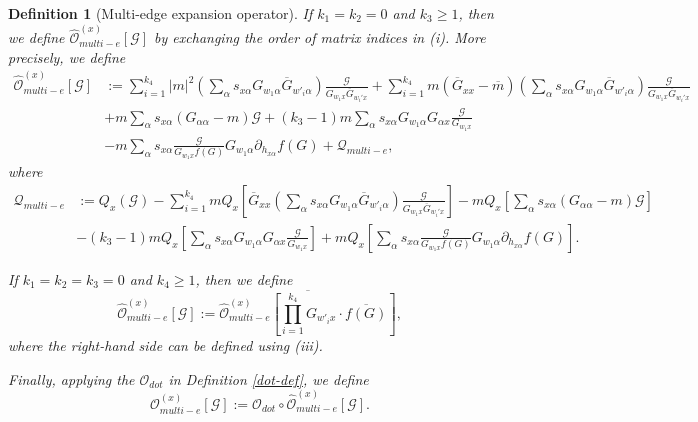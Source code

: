 \documentclass{article}
\newcommand{\1}{\mathds{1}}
\numberwithin{equation}{section}
\newcommand{\al}{\alpha}
\renewcommand{\cal}{\mathcal}
\newcommand{\wh}{\widehat}
\renewcommand{\geq}{\geqslant}
\renewcommand{\ge}{\geq}
\theoremstyle{plain} %
\newtheorem{definition}[theorem]{Definition}
\theoremstyle{remark}
\begin{document}
\begin{definition} [Multi-edge expansion operator]
 If $k_1=k_2=0$ and $k_3 \ge 1$, then we define $ \wh{\cal O}_{multi-e}^{(x)} \left[\cal G\right]$ by exchanging the order of matrix indices in (i). More precisely, we define
\begin{align} 
 \wh{\cal O}_{multi-e}^{(x)} \left[\cal G\right] & := \sum_{i=1}^{k_4}|m|^2  \left( \sum_\al s_{x\al }G_{w_1\al} \overline G_{w'_i\al}\right)\frac{\cal G}{G_{w_1x} \overline G_{w_i'x}}   + \sum_{i=1}^{k_4}m  (\overline G_{xx} -\overline m) \left( \sum_\al s_{x\al }G_{w_1 \al } \overline G_{ w'_i \al}\right)\frac{\cal G}{G_{w_1x} \overline G_{w_i' x}}    \nonumber \\
& +  m   \sum_\al s_{x\al }\left(G_{\al \al}-m\right) \cal G  +(k_3-1) m  \sum_\al s_{x\al }G_{w_1\al} G_{\al x} \frac{ \cal G}{G_{w_1x}} \nonumber\\
&  - m    \sum_\al s_{x\al } \frac{\cal G}{G_{w_1x}f(G)}G_{  w_1 \al}\partial_{ h_{x\al}}f(G)  +\cal Q_{multi-e} ,\label{Oe1x3}
\end{align}
where 
\begin{align*}
  \cal Q_{multi-e} &:= Q_x \left( \cal G\right)  -  \sum_{i=1}^{k_4}m Q_x \left[ \overline G_{xx}  \left( \sum_\al s_{x\al }G_{w_1 \al } \overline G_{ w'_i \al}\right)\frac{\cal G}{G_{w_1 x} \overline G_{w_i' x}} \right]  -  m Q_x \left[  \sum_\al s_{x\al }\left(G_{\al \al}-m\right) \cal G\right] \\
&  -(k_3-1) m Q_x \left[  \sum_\al s_{x\al }G_{w_1 \al } G_{\al x} \frac{ \cal G}{G_{w_1 x}}\right]  +m Q_x \left[  \sum_\al s_{x\al } \frac{\cal G}{G_{w_1x}f(G)}G_{ w_1\al}\partial_{ h_{x\al }}f(G) \right] .%
 \end{align*} 

 If $k_1=k_2=k_3=0$ and $k_4\ge 1$, then we define 
$$\wh{\cal O}_{multi-e}^{(x)} \left[\cal G\right]:= \overline{  \wh{\cal O}_{multi-e}^{(x)} \left[  \prod_{i=1}^{k_4} G_{ w'_i x} \cdot \overline{f (G)}\right] },$$
where the right-hand side can be defined using (iii).
 
Finally, applying the $\cal O_{dot}$ in Definition \ref{dot-def}, we define
$${\cal O}_{multi-e}^{(x)}[ \cal G]:= \cal O_{dot} \circ  \wh{\cal O}_{multi-e}^{(x)}   [\cal G]. $$ 
 \end{definition}
 
\end{document}
